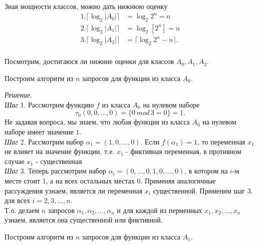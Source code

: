 \documentclass[oneside, final, 12pt]{extreport}
\begin{document}
	\noindent Зная мощности классов, можно дать нижнюю оценку 
	\begin{displaymath}
		\begin{aligned}
			1. \lceil \log_2{|A_0|} \rceil & = \log_2{2^n} = n  \\		
			2. \lceil \log_2{|A_1|} \rceil & = \log_2[2^n] = n  \\
			3. \lceil \log_2{|A_2|} \rceil & = \lceil \log_2{2^n - n} \rceil.  \\
		\end{aligned}
	\end{displaymath}
	
	\noindent Посмотрим, достигаюся ли нижние оценки для классов $A_0, A_1, A_2$. \par
	\bigskip
	\noindent Построим алгоритм из $n$ запросов  для функции из класса  $A_0$.
	
	\noindent\emph{Решение}. \\
	\emph{Шаг} 1. Рассмотрим функцию $f$  из класса $A_0$ на нулевом наборе
	 \[
	 	\tau_0(0, 0, \ldots, 0) =  \{0 \, mod \, 3 = 0\} = 1.
	 \]
	 Не задавая вопроса, мы знаем, что любая функция из класса $A_0$ на нулевом наборе имеет значение $1$.\\
	 \emph{Шаг} 2. Рассмотрим набор $\alpha_1 = (1, 0,  \ldots, 0)$. Если $f(\alpha_1) = 1$, то переменная $x_1$ не влияет на значение функции, т.е. $x_1$ - 
	 фиктивная переменная, в противном случае $x_1$ - существенная \\
	 \emph{Шаг} 3. Теперь рассмотрим набор $\alpha_i = (0, \ldots, 0,  1,  0, \ldots, 0)$, в котором на $i$-м месте стоит $1$, а на всех остальных местах $0$.
	  Применяя аналогичные рассуждения узнаем, является ли переменная $x_i$ существенной. Применим шаг 3. для всех $i = 2, 3, \ldots, n$. \\ 
	 \noindent Т.о. делаем $n$  запросов $\alpha_1, \alpha_2, \ldots, \alpha_n$ и для каждой из перменных $x_1, x_2, \ldots, x_n$ узнаем, является она существенной 
	 или фиктивной.\par
	\bigskip
	\noindent Построим алгоритм из $n$ запросов  для функции из класса  $A_1$.
	
\end{document}
